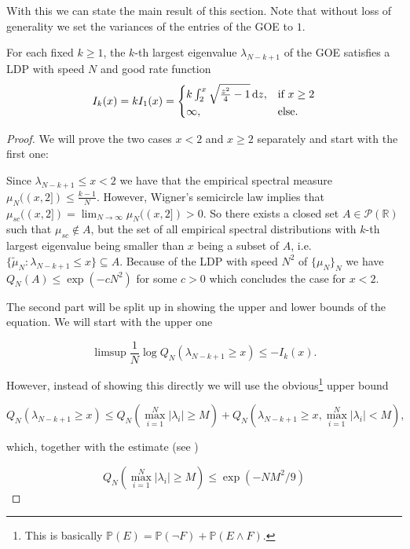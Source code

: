 With this we can state the main result of this section. Note that without loss of generality we set the variances of the entries of the GOE to $1$.
\begin{theorem}\label{thm:A1}
	For each fixed $k\geq 1$, the $k$-th largest eigenvalue $\lambda_{N-k+1}$ of the GOE satisfies a LDP with speed $N$ and good rate function
	$$I_k(x)=kI_1(x)=\begin{cases}
						k\int_2^x\sqrt{\frac{z^2}{4}-1}\mathop{}\!\mathrm{d} z, &\mbox{if } x\geq 2 \\
						\infty, &\mbox{else.}
					  \end{cases}$$
\end{theorem}
\begin{proof}
	We will prove the two cases $x<2$ and $x\geq 2$ separately and start with the first one:
	
	Since $\lambda_{N-k+1}\leq x<2$ we have that the empirical spectral measure $\mu_N((x,2])\leq \frac{k-1}{N}$. However, Wigner's semicircle law implies that $\mu_{sc}((x,2])=\lim_{N\rightarrow\infty} \mu_N((x,2])>0$. So there exists a closed set $A\in\mathcal P(\mathbb R)$ such that $\mu_{sc}\notin A$, but the set of all empirical spectral distributions with $k$-th largest eigenvalue being smaller than $x$ being a subset of $A$, i.e. $\{\tilde \mu_N:\lambda_{N-k+1}\leq x\}\subseteq A$. Because of the LDP with speed  $N^2$ of $\{\mu_N\}_N$ we have $Q_N(A)\leq\exp(-cN^2)$ for some $c>0$ which concludes the case for $x<2$.
	
	The second part will be split up in showing the upper and lower bounds of the equation. We will start with the upper one
	
	\begin{equation}\label{eq:LDPlargestEVupperbound}
		\limsup \frac{1}{N}\log Q_N(\lambda_{N-k+1}\geq x)\leq -I_k(x).
	\end{equation}
	
	However, instead of showing this directly we will use the obvious\footnote{This is basically $\mathbb P(E)=\mathbb P(\neg F)+\mathbb P(E\land F)$.} upper bound
	
	$$Q_N(\lambda_{N-k+1}\geq x)\leq Q_N(\max_{i=1}^N |\lambda_i|\geq M)+ Q_N(\lambda_{N-k+1}\geq x,\max_{i=1}^N|\lambda_i|<M),$$
	
	which, together with the estimate (see \cite{ArousAging})
	
	\begin{equation}\label{eq:maxEVinequality}
		Q_N(\max_{i=1}^N|\lambda_i|\geq M)\leq \exp(-NM^2/9)
	\end{equation}
	

\end{proof}
